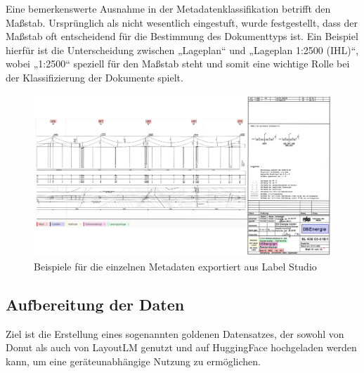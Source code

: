 \documentclass[12pt,a4paper,twoside]{article}
\begin{document}
Eine bemerkenswerte Ausnahme in der Metadatenklassifikation betrifft den Maßstab. Ursprünglich als nicht wesentlich eingestuft, wurde festgestellt, dass der Maßstab oft entscheidend für die Bestimmung des Dokumenttyps ist. Ein Beispiel hierfür ist die Unterscheidung zwischen „Lageplan“ und „Lageplan 1:2500 (IHL)“, wobei „1:2500“ speziell für den Maßstab steht und somit eine wichtige Rolle bei der Klassifizierung der Dokumente spielt.

\begin{figure}[H]
    \centering
    \includegraphics[width=1.0\linewidth]{DOKUMENT-Metadaten-Beispiel-2.png}
    \caption{Beispiele für die einzelnen Metadaten exportiert aus Label Studio}
    \label{fig:enter-label}
\end{figure}

\subsection{Aufbereitung der Daten}
Ziel ist die Erstellung eines sogenannten goldenen Datensatzes, der sowohl von Donut als auch von LayoutLM genutzt und auf HuggingFace hochgeladen werden kann, um eine geräteunabhängige Nutzung zu ermöglichen.
\end{document}

